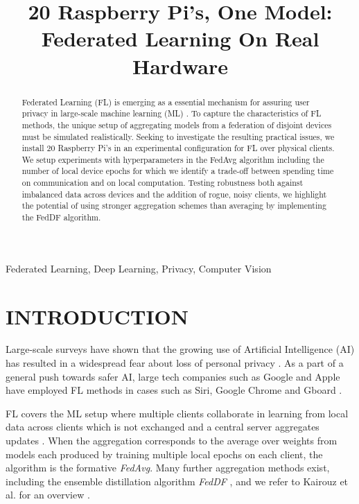 \documentclass{article}
\title{20 Raspberry Pi's, One Model: Federated Learning On Real Hardware}
\begin{document}
%

\maketitle
%
\begin{abstract}
    Federated Learning (FL) is emerging as a essential mechanism for assuring user privacy in large-scale machine learning (ML) \cite{kai2021advances}.
    To capture the characteristics of FL methods, the unique setup of aggregating models from a federation of disjoint devices must be simulated realistically.
    Seeking to investigate the resulting practical issues, we install 20 Raspberry Pi's in an experimental configuration for FL over physical clients.
    We setup experiments with hyperparameters in the FedAvg \cite{mcmahan2017communication} algorithm including the number of local device epochs for which we identify a trade-off between spending time on communication and on local computation.
    Testing robustness both against imbalanced data across devices and the addition of rogue, noisy clients, we highlight the potential of using stronger aggregation schemes than averaging by implementing the FedDF \cite{lin2020ensemble} algorithm.
\end{abstract}
%
\begin{keywords}
    Federated Learning, Deep Learning, Privacy, Computer Vision
\end{keywords}

\section{INTRODUCTION}
\label{sec:intro}
Large-scale surveys have shown that the growing use of Artificial Intelligence (AI) has resulted in a widespread fear about loss of personal privacy \cite{beuc2020consumers, west2018survey}.
As a part of a general push towards safer AI, large tech companies such as Google and Apple have employed FL methods in cases such as Siri, Google Chrome and Gboard \cite{kai2021advances}.

FL covers the ML setup where multiple clients collaborate in learning from local data across clients which is not exchanged and a central server aggregates updates \cite{kai2021advances, mcmahan2017communication}.
When the aggregation corresponds to the average over weights from models each produced by training multiple local epochs on each client, the algorithm is the formative \emph{FedAvg}\cite{mcmahan2017communication}.
Many further aggregation methods exist, including the ensemble distillation algorithm \emph{FedDF} \cite{lin2020ensemble}, and we refer to Kairouz et al. for an overview \cite{kai2021advances}.
\end{document}
